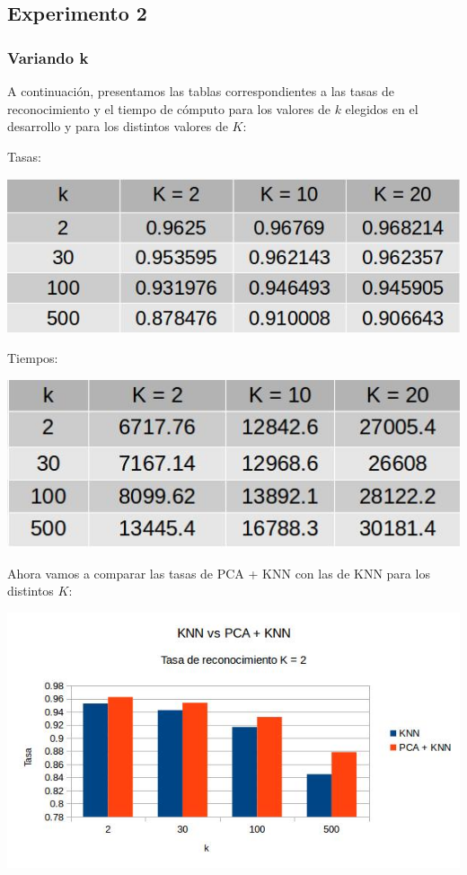 \subsection{Experimento 2}
\subsubsection{Variando k}
A continuación, presentamos las tablas correspondientes a las tasas de reconocimiento y el tiempo de cómputo para los valores de $k$ elegidos en el desarrollo y para los distintos valores de $K$:
\newline
\newline
\centerline{Tasas:}
\newline
\centerline{
\includegraphics[scale=0.4]{Tablas/variandoktr.jpg}
}
\newline
\newline
\centerline{Tiempos:}
\newline
\centerline{
\includegraphics[scale=0.4]{Tablas/variandok.jpg}
}
\newline
\newline
Ahora vamos a comparar las tasas de PCA + KNN con las de KNN para los distintos $K$:
\newline
\newline
\centerline{
\includegraphics[scale=0.5]{Tablas/comtrK2.jpg}
}
